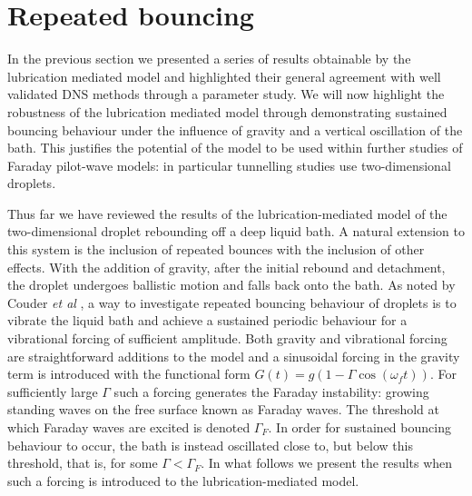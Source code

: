 
\section{Repeated bouncing}\label{sect:Faraday}

In the previous section we presented a series of results obtainable by the lubrication mediated model and highlighted their general agreement with well validated DNS methods through a parameter study. We will now highlight the robustness of the lubrication mediated model through demonstrating sustained bouncing behaviour under the influence of gravity and a vertical oscillation of the bath. This justifies the potential of the model to be used within further studies of Faraday pilot-wave models: in particular tunnelling studies \cite{nachbin2017tunneling} use two-dimensional droplets. 

Thus far we have reviewed the results of the lubrication-mediated model of the two-dimensional droplet rebounding off a deep liquid bath. A natural extension to this system is the inclusion of repeated bounces with the inclusion of other effects. With the addition of gravity, after the initial rebound and detachment, the droplet undergoes ballistic motion and falls back onto the bath. As noted by Couder \textit{et al} \cite{couder2005walking}, a way to investigate repeated bouncing behaviour of droplets is to vibrate the liquid bath and achieve a sustained periodic behaviour for a vibrational forcing of sufficient amplitude. Both gravity and vibrational forcing are straightforward additions to the model and a sinusoidal forcing in the gravity term is introduced with the functional form $G(t) = g(1 - \Gamma \cos(\omega_f t))$.  For sufficiently large $\Gamma$ such a forcing generates the Faraday instability: growing standing waves on the free surface known as Faraday waves. The threshold at which Faraday waves are excited is denoted $\Gamma_F$. In order for sustained bouncing behaviour to occur, the bath is instead oscillated close to, but below this threshold, that is, for some $\Gamma < \Gamma_F$. In what follows we present the results when such a forcing is introduced to the lubrication-mediated model. 

